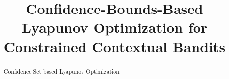\documentclass[wcp]{jmlr}
\title[Confidence-Bounds-Based Lyapunov Optimization]{Confidence-Bounds-Based Lyapunov Optimization for Constrained Contextual Bandits}
\begin{document}
\maketitle

\begin{abstract}
Confidence Set based Lyapunov Optimization.
\end{abstract}




















%
%

%
\end{document}
